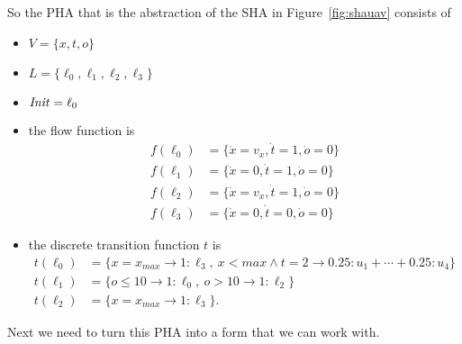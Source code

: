 \begin{ex}
So the PHA that is the abstraction of the SHA in Figure~\ref{fig:shauav} consists of
\begin{itemize}
    \item $V=\{x,t,o\}$
    \item $L=\{\ell_{0},\ell_{1},\ell_{2},\ell_{3}\}$
    \item $\mathit{Init}=\ell_{0}$
    \item the flow function is
        \begin{align*}
            f(\ell_{0}) &= \{\dot{x}=v_{x},\dot{t}=1,\dot{o}=0\} \\
            f(\ell_{1}) &= \{\dot{x}=0,\dot{t}=1,\dot{o}=0\} \\
            f(\ell_{2}) &= \{\dot{x}=v_{x},\dot{t}=1,\dot{o}=0\} \\
            f(\ell_{3}) &= \{\dot{x}=0,\dot{t}=0,\dot{o}=0\}
        \end{align*}
    \item the discrete transition function $t$ is
        \begin{align*}
            t(\ell_{0}) &= \{x=x_{max}\rightarrow 1:\ell_{3},\ x<max\land t=2\rightarrow 0.25:u_{1}+\cdots+0.25:u_{4}\} \\
            t(\ell_{1}) &= \{o\leq10\rightarrow 1:\ell_{0},\ o>10\rightarrow 1:\ell_{2}\} \\
            t(\ell_{2}) &= \{x=x_{max}\rightarrow 1:\ell_{3}\}.
        \end{align*}
\end{itemize}
Next we need to turn this PHA into a form that we can work with.


\end{ex}
